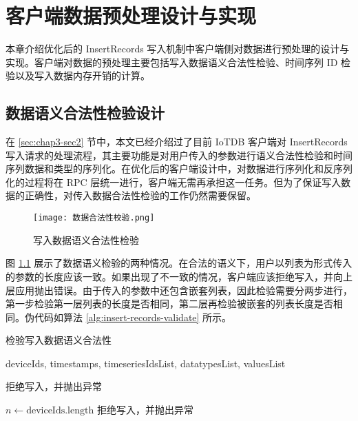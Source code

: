 
\chapter{客户端数据预处理设计与实现\label{chap:client-design}}
本章介绍优化后的 InsertRecords 写入机制中客户端侧对数据进行预处理的设计与实现。客户端对数据的预处理主要包括写入数据语义合法性检验、时间序列 ID 检验以及写入数据内存开销的计算。
\section{数据语义合法性检验设计}
在 \ref{sec:chap3-sec2} 节中，本文已经介绍过了目前 IoTDB 客户端对 InsertRecords 写入请求的处理流程，其主要功能是对用户传入的参数进行语义合法性检验和时间序列数据和类型的序列化。在优化后的客户端设计中，对数据进行序列化和反序列化的过程将在 RPC 层统一进行，客户端无需再承担这一任务。但为了保证写入数据的正确性，对传入数据合法性检验的工作仍然需要保留。

\begin{figure}
  \centering
  \texttt{[image: 数据合法性校验.png]}
  \caption{写入数据语义合法性检验}
  \label{fig:client-data-validate}
\end{figure}

图 \ref{fig:client-data-validate} 展示了数据语义检验的两种情况。在合法的语义下，用户以列表为形式传入的参数的长度应该一致。如果出现了不一致的情况，客户端应该拒绝写入，并向上层应用抛出错误。由于传入的参数中还包含嵌套列表，因此检验需要分两步进行，第一步检验第一层列表的长度是否相同，第二层再检验被嵌套的列表长度是否相同。伪代码如算法 \ref{alg:insert-records-validate} 所示。

\begin{algorithm}
  \caption{检验写入数据语义合法性}
  \label{alg:insert-records-validate}
  \small
  \begin{algorithmic}
    \REQUIRE deviceIds, timestamps, timeseriesIdsList, datatypesList, valuesList

     \STATE 拒绝写入，并抛出异常
    \ENDIF

    \STATE $n \leftarrow \text{deviceIds.length}$
        \STATE 拒绝写入，并抛出异常
      \ENDIF
    \ENDFOR

  \end{algorithmic}
\end{algorithm}

